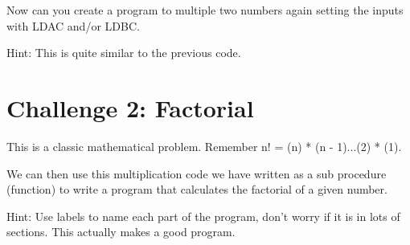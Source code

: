 \documentclass[10pt,a4paper]{article}
\begin{document}
Now can you create a program to multiple two numbers again setting the inputs with LDAC and/or LDBC.

Hint: This is quite similar to the previous code.

\section{Challenge 2: Factorial}

This is a classic mathematical problem. Remember n! = (n) * (n - 1)...(2) * (1).

We can then use this multiplication code we have written as a sub procedure (function) to write a program that calculates the factorial of a
given number.

Hint: Use labels to name each part of the program, don't worry if it is in lots of sections. This actually makes a good program.
\end{document}
